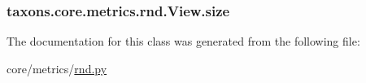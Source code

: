 \subsubsection[{\texorpdfstring{size}{size}}]{\setlength{\rightskip}{0pt plus 5cm}taxons.\+core.\+metrics.\+rnd.\+View.\+size}\hypertarget{classtaxons_1_1core_1_1metrics_1_1rnd_1_1_view_a2ffa3e9054c13eed8992919a55edbefe}{}\label{classtaxons_1_1core_1_1metrics_1_1rnd_1_1_view_a2ffa3e9054c13eed8992919a55edbefe}


The documentation for this class was generated from the following file\+:\begin{DoxyCompactItemize}
\item 
core/metrics/\hyperlink{rnd_8py}{rnd.\+py}\end{DoxyCompactItemize}
